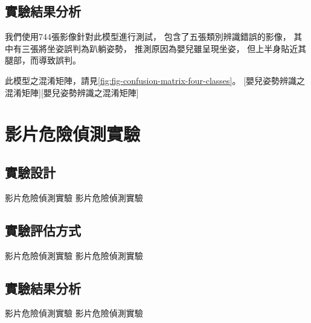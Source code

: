 \documentclass[class=NCU_thesis, crop=false]{standalone}
\begin{document}
\subsection{實驗結果分析}
我們使用744張影像針對此模型進行測試，
包含了五張類別辨識錯誤的影像，
其中有三張將坐姿誤判為趴躺姿勢，
推測原因為嬰兒雖呈現坐姿，
但上半身貼近其腿部，而導致誤判。

此模型之混淆矩陣，請見\cref{fig:fig-confusion-matrix-four-classes}。
[嬰兒姿勢辨識之混淆矩陣][嬰兒姿勢辨識之混淆矩陣]

\section{影片危險偵測實驗}
\subsection{實驗設計}
影片危險偵測實驗 影片危險偵測實驗

\subsection{實驗評估方式}
影片危險偵測實驗 影片危險偵測實驗

\subsection{實驗結果分析}
影片危險偵測實驗 影片危險偵測實驗
\end{document}
